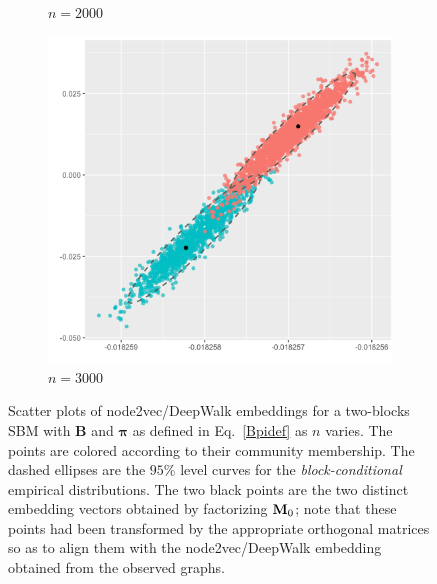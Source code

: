 \documentclass[10pt,journal,compsoc]{IEEEtran}
\newcommand{\bds}{\boldsymbol}
\newcommand{\M}[1]{{{\mathbf{\MakeUppercase{#1}}}}}
\numberwithin{equation}{section}
\begin{document}
\begin{figure}
\begin{subfigure}{.32\columnwidth}
\caption{$n = 2000$}
\end{subfigure}
\begin{subfigure}{.32\columnwidth}
\includegraphics[width=\columnwidth]{CLT_1_4.png}%
\caption{$n = 3000$}
\end{subfigure}
\caption{Scatter plots of node2vec/DeepWalk embeddings
    for a two-blocks SBM with $\mathbf{B}$ and
    $\bds{\pi}$ as defined in Eq.~\eqref{Bpidef} as $n$ varies. The points are colored according to their community membership. The dashed ellipses are the $95\%$ level curves for the {\em block-conditional} empirical distributions. The two black points are the two distinct embedding vectors obtained by factorizing ${\M M}_0$; note that these points had been transformed by the appropriate orthogonal matrices so as to align them with the node2vec/DeepWalk embedding obtained from the observed graphs.}\label{f:embd:sbm}
\end{figure}
\end{document}
